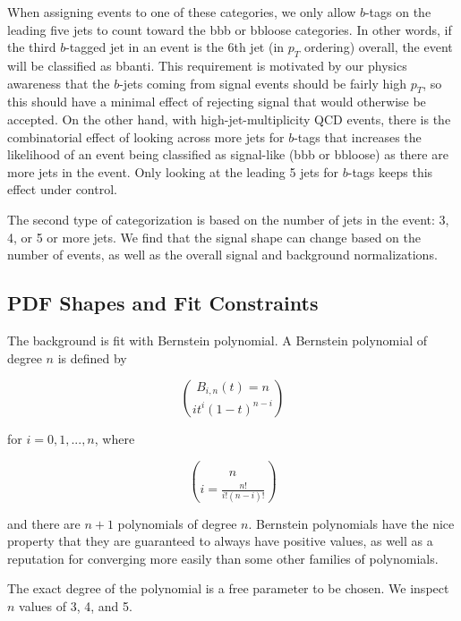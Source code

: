 When assigning events to one of these categories, we only allow $b$-tags on the leading
five jets to count toward the bbb or bbloose categories.  In other words, if the third
$b$-tagged jet in an event is the 6th jet (in $p_T$ ordering) overall, the event 
will be classified as bbanti.  This requirement is motivated by our physics awareness that
the $b$-jets coming from signal events should be fairly high $p_T$, so this should have
a minimal effect of rejecting signal that would otherwise be accepted.  On the other
hand, with high-jet-multiplicity QCD events, there is the combinatorial effect of looking across
more jets for $b$-tags that increases the likelihood of an event being classified as signal-like
(bbb or bbloose) as there are more jets in the event.  Only looking at the leading 5 jets
for $b$-tags keeps this effect under control. 


The second type of categorization is based on the number of 
jets in the event: 3, 4, or 5 or more jets.  We find that the signal
shape can change based on the number of events, as well as the overall
signal and background normalizations. 




\subsection{PDF Shapes and Fit Constraints}
\label{sec:pdfs}

The background is fit with Bernstein polynomial.  A Bernstein polynomial of degree $n$ is
defined by

\begin{equation}
B_{i,n}(t) = n\choose{i} t^i (1-t)^{n-i}
\end{equation}

for $i=0,1,...,n$, where

\begin{equation}
n\choose{i} = \frac{n!}{i!(n-i)!}
\end{equation}

and there are $n+1$ polynomials of degree $n$.  Bernstein polynomials have the nice property
that they are guaranteed to always have positive values, as well as a reputation for
converging more easily than some other families of polynomials.

The exact degree of the polynomial is a free parameter to be chosen.  We inspect $n$ values
of 3, 4, and 5.




